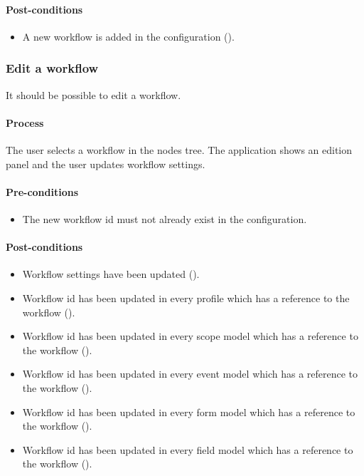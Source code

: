 \documentclass[11pt,a4paper,oneside]{article}
\begin{document}
\paragraph{Post-conditions}
\begin{itemize}
	\item A new workflow is added in the configuration ().
\end{itemize}

\subsubsection{Edit a workflow}
It should be possible to edit a workflow.

\paragraph{Process}
The user selects a workflow in the nodes tree. The application shows an edition panel and the user updates workflow settings.

\paragraph{Pre-conditions}
\begin{itemize}
	\item The new workflow id must not already exist in the configuration.
\end{itemize}

\paragraph{Post-conditions}
\begin{itemize}
	\item Workflow settings have been updated ().
	\item Workflow id has been updated in every profile which has a reference to the workflow ().
	\item Workflow id has been updated in every scope model which has a reference to the workflow ().
	\item Workflow id has been updated in every event model which has a reference to the workflow ().
	\item Workflow id has been updated in every form model which has a reference to the workflow ().
	\item Workflow id has been updated in every field model which has a reference to the workflow ().
\end{itemize}
\end{document}
